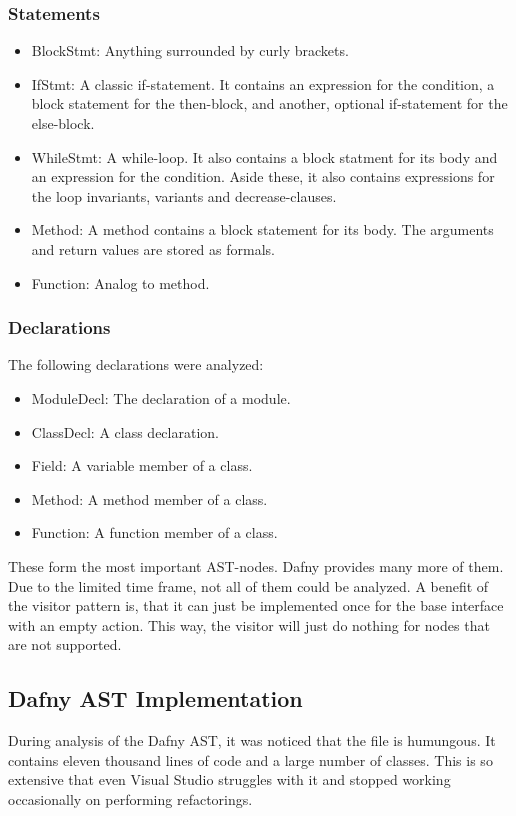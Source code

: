 \subsubsection{Statements}
\begin{itemize}
    \item BlockStmt: Anything surrounded by curly brackets.
    \item IfStmt: A classic if-statement. It contains an expression for the condition, a block statement for the then-block, and another, optional if-statement for the else-block.
    \item WhileStmt: A while-loop. It also contains a block statment for its body and an expression for the condition. Aside these, it also contains expressions for the loop invariants, variants and decrease-clauses.
    \item Method: A method contains a block statement for its body. The arguments and return values are stored as formals.
    \item Function: Analog to method.
\end{itemize}

\subsubsection{Declarations}
The following declarations were analyzed:
\begin{itemize}
    \item ModuleDecl: The declaration of a module.
    \item ClassDecl: A class declaration.
    \item Field: A variable member of a class.
    \item Method: A method member of a class.
    \item Function: A function member of a class.
\end{itemize}
These form the most important AST-nodes.
Dafny provides many more of them.
Due to the limited time frame, not all of them could be analyzed.
A benefit of the visitor pattern is, that it can just be implemented once for the base interface  with an empty action.
This way, the visitor will just do nothing for nodes that are not supported.

\subsection{Dafny AST Implementation}
During analysis of the Dafny AST, it was noticed that the file  is humungous.
It contains eleven thousand lines of code and a large number of classes.
This is so extensive that even Visual Studio struggles with it and stopped working occasionally on performing refactorings.\\

